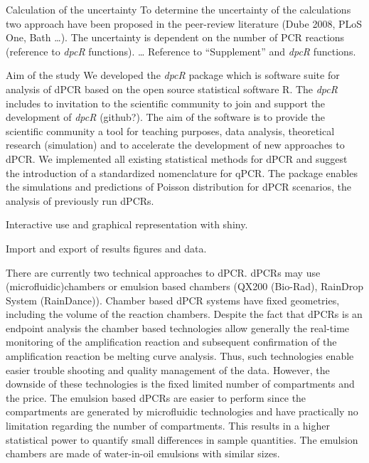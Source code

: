 \documentclass{bioinfo}
\begin{document}
Calculation of the uncertainty
To determine the uncertainty of the calculations two approach have been proposed in the peer-review literature (Dube 2008, PLoS One, Bath …). The uncertainty is dependent on the number of PCR reactions (reference to \textit{\textit{dpcR}} functions). … Reference to ``Supplement'' and \textit{dpcR} functions.

Aim of the study
We developed the \textit{dpcR} package which is software suite for analysis of dPCR based on the open source statistical software R. The \textit{dpcR} includes to invitation to the scientific community to join and support the development of \textit{dpcR} (github?). The aim of the software is to provide the scientific community a tool for teaching purposes, data analysis, theoretical research (simulation) and to accelerate the development of new approaches to dPCR. We implemented all existing statistical methods for dPCR and suggest the introduction of a standardized nomenclature for qPCR. The package enables the simulations and predictions of Poisson distribution for dPCR scenarios, the analysis of previously run dPCRs.

Interactive use and graphical representation with shiny.

Import and export of results figures and data.

There are currently two technical approaches to dPCR. dPCRs may use		%
(microfluidic)chambers or emulsion based chambers 
(QX200 \texttrademark (Bio-Rad), RainDrop \texttrademark System (RainDance)). 
Chamber based dPCR systems have fixed geometries, including the volume of the 
reaction chambers. Despite the fact that dPCRs is an endpoint analysis the 
chamber based technologies allow generally the real-time monitoring of the 
amplification reaction and subsequent confirmation of the amplification reaction 
be melting curve analysis. Thus, such technologies enable easier trouble 
shooting and quality management of the data. However, the downside of these 
technologies is the fixed limited number of compartments and the price. The 
emulsion based dPCRs are easier to perform since the compartments are generated 
by microfluidic technologies and have practically no limitation regarding the 
number of compartments. This results in a higher statistical power to quantify 
small differences in sample quantities. The emulsion chambers are made of 
water-in-oil emulsions with similar sizes.
\end{document}

